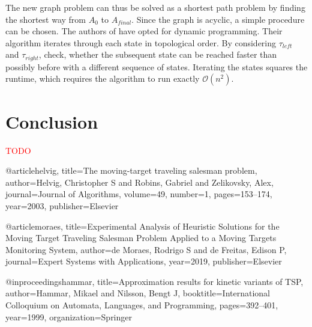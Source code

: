 \documentclass[english,version-2019-07]{uzl-thesis}
\begin{document}
The new graph problem can thus be solved as a shortest path problem by finding the shortest way from $A_0$ to $A_{final}$.  Since the graph is acyclic, a simple procedure can be chosen. The authors of \cite{helvig} have opted for dynamic programming. Their algorithm iterates through each state in topological order. By considering $\tau_{left}$ and $\tau_{right}$, check, whether the subsequent state can be reached faster than possibly before with a different sequence of states. Iterating the states squares the runtime, which requires the algorithm to run exactly $\mathcal{O}(n^2)$.

\chapter{Conclusion}


%

\textcolor{red}{TODO}



%

\begin{bibtex-entries}

@article{helvig,
  title={The moving-target traveling salesman problem},
  author={Helvig, Christopher S and Robins, Gabriel and Zelikovsky, Alex},
  journal={Journal of Algorithms},
  volume={49},
  number={1},
  pages={153--174},
  year={2003},
  publisher={Elsevier}
}

@article{moraes,
  title={Experimental Analysis of Heuristic Solutions for the Moving Target Traveling Salesman Problem Applied to a Moving Targets Monitoring System},
  author={de Moraes, Rodrigo S and de Freitas, Edison P},
  journal={Expert Systems with Applications},
  year={2019},
  publisher={Elsevier}
}

@inproceedings{hammar,
  title={Approximation results for kinetic variants of TSP},
  author={Hammar, Mikael and Nilsson, Bengt J},
  booktitle={International Colloquium on Automata, Languages, and Programming},
  pages={392--401},
  year={1999},
  organization={Springer}
}


\end{bibtex-entries}
\end{document}
